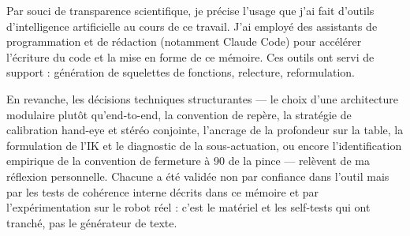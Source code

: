 Par souci de transparence scientifique, je précise l'usage que j'ai fait
d'outils d'intelligence artificielle au cours de ce travail. J'ai employé des
assistants de programmation et de rédaction (notamment Claude Code) pour
accélérer l'écriture du code et la mise en forme de ce mémoire. Ces outils ont
servi de support : génération de squelettes de fonctions, relecture, reformulation.

En revanche, les décisions techniques structurantes --- le choix d'une
architecture modulaire plutôt qu'end-to-end, la convention de repère, la
stratégie de calibration hand-eye et stéréo conjointe, l'ancrage de la profondeur
sur la table, la formulation de l'IK et le diagnostic de la sous-actuation, ou
encore l'identification empirique de la convention de fermeture à 90\textdegree{}
de la pince --- relèvent de ma réflexion personnelle. Chacune a été validée non
par confiance dans l'outil mais par les tests de cohérence interne décrits dans
ce mémoire et par l'expérimentation sur le robot réel : c'est le matériel et les
self-tests qui ont tranché, pas le générateur de texte.
